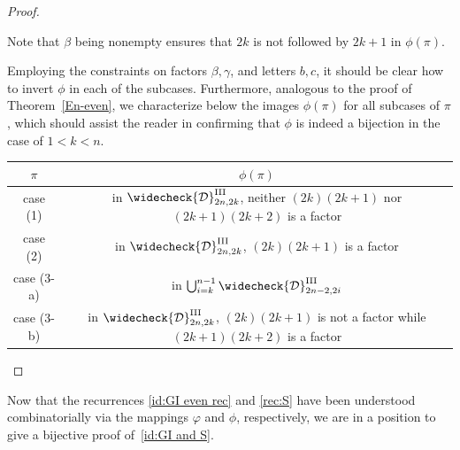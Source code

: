 \documentclass[11pt,reqno]{amsart}
\numberwithin{equation}{section}
\theoremstyle{plain}
\theoremstyle{definition}
\newcommand{\D}{\mathcal{D}}
\newcommand{\cD}{\widecheck{\D}^{\mathrm{III}}}
\begin{document}
\begin{proof}
\begin{enumerate}[label=(\arabic*)]
\begin{enumerate}
			Note that $\beta$ being nonempty ensures that $2k$ is not followed by $2k+1$ in $\phi(\pi)$.
		\end{enumerate}
		
	\end{enumerate}	
	Employing the constraints on factors $\beta,\gamma$, and letters $b,c$, it should be clear how to invert $\phi$ in each of the subcases. Furthermore, analogous to the proof of Theorem~\ref{En-even}, we characterize below the images $\phi(\pi)$ for all subcases of $\pi$, which should assist the reader in confirming that $\phi$ is indeed a bijection in the case of $1<k<n$.
	\begin{table}[h!]
		\renewcommand{\arraystretch}{1.5}
		\centering
		\begin{tabular}{c|c}
			$\pi$ & $\phi(\pi)$ \\ \hline
			case (1) & in $\cD_{2n,2k}$, neither $(2k)(2k+1)$ nor $(2k+1)(2k+2)$ is a factor \\ 
			case (2) & in $\cD_{2n,2k}$, $(2k)(2k+1)$ is a factor\\
			case (3-a) & in $\bigcup_{i=k}^{n-1}\cD_{2n-2,2i}$ \\ 
			case (3-b) & in $\cD_{2n,2k}$, $(2k)(2k+1)$ is not a factor while $(2k+1)(2k+2)$ is a factor   
		\end{tabular}
	\end{table}
\end{proof}

Now that the recurrences \eqref{id:GI even rec} and \eqref{rec:S} have been understood combinatorially via the mappings $\varphi$ and $\phi$, respectively, we are in a position to give a bijective proof of~\eqref{id:GI and S}.
\end{document}
